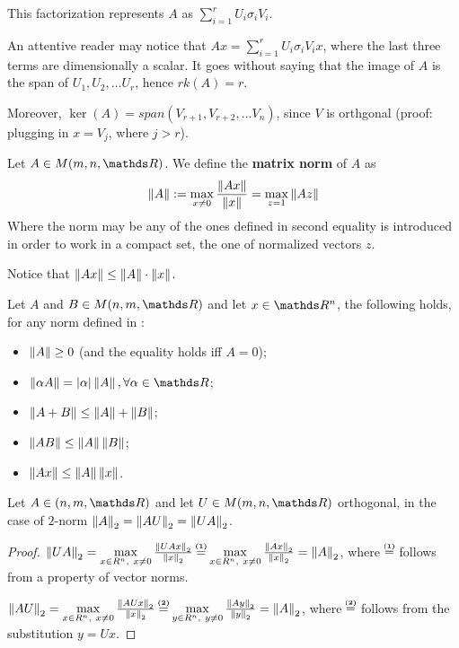 \documentclass[computational_mathematics.tex]{subfiles}
\begin{document}
This factorization represents $A$ as $\sum\limits_{i=1}^r U_i \sigma_i V_i$. 

An attentive reader may notice that $Ax = \sum\limits_{i=1}^r U_i \sigma_i V_i x$, where the last three terms are dimensionally a scalar.
It goes without saying that the image of $A$ is the span of $U_1, U_2, \ldots U_r$, hence $rk(A) = r$.

Moreover, $\ker(A)=span(V_{r+1}, V_{r+2}, \ldots V_{n})$, since $V$ is orthgonal (proof: plugging in $x=V_j$, where $j>r$). 

\begin{definition}
  Let $A \in M(m, n, \R)$. We define the \textbf{matrix norm} of $A$ as
  \[
    \left\lVert A\right\rVert := \max\limits_{x \neq 0} \frac{\left\lVert Ax\right\rVert}{\left\lVert x\right\rVert} = \max\limits_{z=1}\left\lVert Az\right\rVert
  \]
  Where the norm may be any of the ones defined in  second equality is introduced in order to work in a compact set, the one of normalized vectors $z$.
\end{definition}

Notice that $\left\lVert Ax\right\rVert \le \left\lVert A\right\rVert \cdot \left\lVert x\right\rVert$.

\begin{property}\label{prop:28sett_norms}
  Let $A$ and $B \in M(n, m, \R)$ and let $x \in \R^n$, the following holds, for any norm defined in :
  \begin{itemize}
    \item $\left\lVert A\right\rVert \ge 0$ (and the equality holds iff $A=0$);
    \item $\norm{\alpha A} = |\alpha| \norm{A}, \forall \alpha \in \R$;
    \item $\left\lVert A+B\right\rVert \le \left\lVert A\right\rVert + \left\lVert B\right\rVert$;
    \item $\left\lVert AB\right\rVert \le \left\lVert A\right\rVert \left\lVert B\right\rVert$;
    \item $\left\lVert Ax\right\rVert \le \left\lVert A\right\rVert \left\lVert x\right\rVert$.
  \end{itemize}
\end{property}

\begin{proposition}\label{fact:28sett_orthogonorm}
  Let $A \in (n, m, \R)$ and let $U \in M(m, n, \R)$ orthogonal, in the case of $2$-norm $\left\lVert A\right\rVert_2 = \left\lVert AU\right\rVert_2 = \left\lVert UA\right\rVert_2$.
\end{proposition}

\begin{proof}
  $\norm{UA}_2 = \max\limits_{x \in R^n,~x \ne 0} \frac{\norm{UAx}_2}{\norm{x}_2} \numeq{(1)} \max\limits_{x \in R^n,~x \ne 0} \frac{\norm{Ax}_2}{\norm{x}_2} = \norm{A}_2$, where $\numeq{(1)}$ follows from a property of vector norms.

 $\norm{AU}_2 = \max\limits_{x \in R^n,~x \ne 0} \frac{\norm{AUx}_2}{\norm{x}_2} \numeq{(2)} \max\limits_{y \in R^n,~y \ne 0} \frac{\norm{Ay}_2}{\norm{y}_2} = \norm{A}_2$, where $\numeq{(2)}$ follows from the substitution $y=Ux$.
\end{proof}
\end{document}
